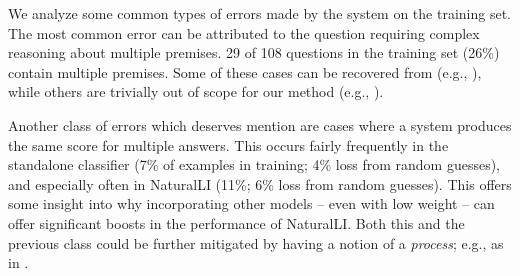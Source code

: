 %
%



%
%

We analyze some common types of errors made by the system on the training set.
The most common error can be attributed to the question requiring complex reasoning
  about multiple premises.
\num{29} of \num{108} questions in the training set (26\%) contain multiple
  premises.
Some of these cases can be recovered from 
  (e.g., ), 
  while others are trivially out of scope for our method 
  (e.g., ).

Another class of errors which deserves mention are cases where a system produces
  the same score for multiple answers.
This occurs fairly frequently in the standalone classifier 
  (7\% of examples in training; 4\% loss from random guesses),
  and especially often in NaturalLI (11\%; 6\% loss from random guesses).
This offers some insight into why incorporating other models -- even with
  low weight -- can offer significant boosts in the performance
  of NaturalLI.
Both this and the previous class could be further mitigated
  by having a notion of a \textit{process}; e.g., as in
  .


